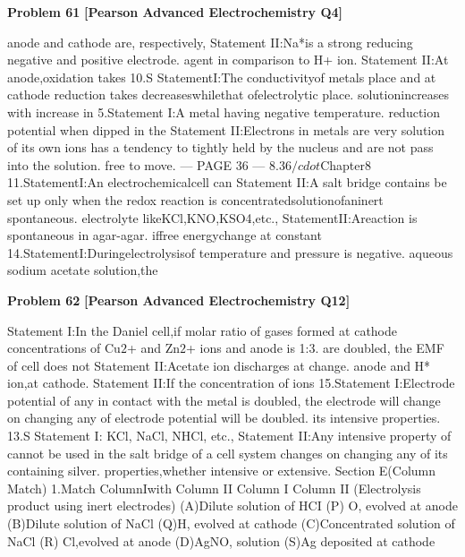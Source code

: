 \begin{problembox}
\textbf{Problem 61} \hfill \textbf{[Pearson Advanced Electrochemistry Q4]}
\label{q:ext-pearson-61}

anode and cathode are, respectively,
Statement II:Na*is a strong reducing
negative and positive electrode.
agent in comparison to H+ ion.
Statement II:At anode,oxidation takes
10.S
StatementI:The conductivityof metals
place and at cathode reduction takes
decreaseswhilethat ofelectrolytic
place.
solutionincreases with increase in
5.Statement I:A metal having negative
temperature.
reduction potential when dipped in the
Statement II:Electrons in metals are very
solution of its own ions has a tendency to
tightly held by the nucleus and are not
pass into the solution.
free to move.
--- PAGE 36 ---
8.36$/cdot$Chapter8
11.StatementI:An electrochemicalcell can
Statement II:A salt bridge contains
be set up only when the redox reaction is
concentratedsolutionofaninert
spontaneous.
electrolyte likeKCl,KNO,KSO4,etc.,
StatementII:Areaction is spontaneous
in agar-agar.
iffree energychange at constant
14.StatementI:Duringelectrolysisof
temperature and pressure is negative.
aqueous sodium acetate solution,the
\end{problembox}

\begin{problembox}
\textbf{Problem 62} \hfill \textbf{[Pearson Advanced Electrochemistry Q12]}
\label{q:ext-pearson-62}

Statement I:In the Daniel cell,if
molar ratio of gases formed at cathode
concentrations of Cu$2$+ and Zn$2$+ ions
and anode is 1:3.
are doubled, the EMF of cell does not
Statement II:Acetate ion discharges at
change.
anode and H* ion,at cathode.
Statement II:If the concentration of ions
15.Statement I:Electrode potential of any
in contact with the metal is doubled, the
electrode will change on changing any of
electrode potential will be doubled.
its intensive properties.
13.S
Statement I: KCl, NaCl, NHCl, etc.,
Statement II:Any intensive property of
cannot be used in the salt bridge of a cell
system changes on changing any of its
containing silver.
properties,whether intensive or extensive.
Section E(Column Match)
1.Match ColumnIwith Column II
Column I
Column II (Electrolysis product using inert
electrodes)
(A)Dilute solution of HCI
(P) O, evolved at anode
(B)Dilute solution of NaCl
(Q)H, evolved at cathode
(C)Concentrated solution of NaCl
(R) Cl,evolved at anode
(D)AgNO, solution
(S)Ag deposited at cathode
\end{problembox}

